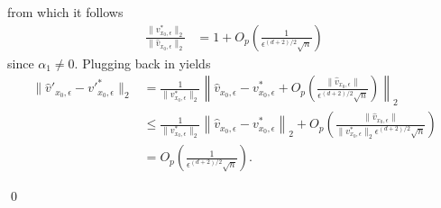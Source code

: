 \documentclass[11pt]{article}
\begin{document}
from which it follows
\begin{align}
    \frac{\|v^*_{x_0, \epsilon}\|_2}{\|\hat{v}_{x_0, \epsilon}\|_2} &= 1 + O_p\left(\frac{1}{\epsilon^{(d+2)/2}\sqrt{n}}\right) \label{eq: velocity norm ratio}
\end{align}
since $\alpha_1 \neq 0$. Plugging back in yields
\begin{align}
    \|\hat{v}'_{x_0, \epsilon} - v'^*_{x_0, \epsilon}\|_2 &=  \frac{1}{\|v^*_{x_0, \epsilon}\|_2}\left\|\hat{v}_{x_0, \epsilon} - v^*_{x_0, \epsilon} + O_p\left(\frac{\|\hat{v}_{x_0, \epsilon}\|}{\epsilon^{(d+2)/2}\sqrt{n}}\right)\right\|_2 \\
    &\leq \frac{1}{\|v^*_{x_0, \epsilon}\|_2}\left\|\hat{v}_{x_0, \epsilon} - v^*_{x_0, \epsilon} \right\|_2 + O_p\left(\frac{\|\hat{v}_{x_0, \epsilon}\|}{\|v^*_{x_0, \epsilon}\|_2\epsilon^{(d+2)/2}\sqrt{n}}\right) \\
    &= O_p\left(\frac{1}{\epsilon^{(d+2)/2}\sqrt{n}}\right) .
\end{align}

\qed{}
\end{document}
